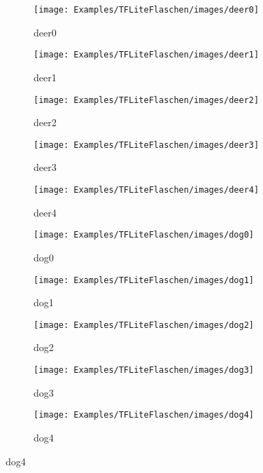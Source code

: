 \begin{figure} [H]
	    \begin{subfigure}{0.19\textwidth}
    \centering
	\texttt{[image: Examples/TFLiteFlaschen/images/deer0]}
	\caption{deer0}
	\end{subfigure}
	\begin{subfigure}{0.19\textwidth}
    \centering
	\texttt{[image: Examples/TFLiteFlaschen/images/deer1]}
	\caption{deer1}
	\end{subfigure}
	\begin{subfigure}{0.19\textwidth}
    \centering
	\texttt{[image: Examples/TFLiteFlaschen/images/deer2]}
	\caption{deer2}
	\end{subfigure}
	\begin{subfigure}{0.19\textwidth}
    \centering
	\texttt{[image: Examples/TFLiteFlaschen/images/deer3]}
	\caption{deer3}
	\end{subfigure}
	\begin{subfigure}{0.19\textwidth}
    \centering
	\texttt{[image: Examples/TFLiteFlaschen/images/deer4]}
	\caption{deer4}
	\end{subfigure}
	
	    \begin{subfigure}{0.19\textwidth}
    \centering
	\texttt{[image: Examples/TFLiteFlaschen/images/dog0]}
	\caption{dog0}
	\end{subfigure}
	\begin{subfigure}{0.19\textwidth}
    \centering
	\texttt{[image: Examples/TFLiteFlaschen/images/dog1]}
	\caption{dog1}
	\end{subfigure}
	\begin{subfigure}{0.19\textwidth}
    \centering
	\texttt{[image: Examples/TFLiteFlaschen/images/dog2]}
	\caption{dog2}
	\end{subfigure}
	\begin{subfigure}{0.19\textwidth}
    \centering
	\texttt{[image: Examples/TFLiteFlaschen/images/dog3]}
	\caption{dog3}
	\end{subfigure}
	\begin{subfigure}{0.19\textwidth}
    \centering
	\texttt{[image: Examples/TFLiteFlaschen/images/dog4]}
	\caption{dog4}
	\end{subfigure}
	

\end{figure}
